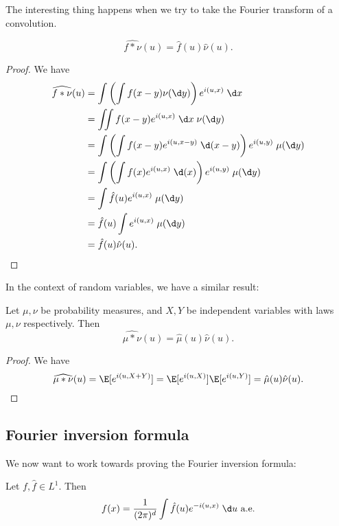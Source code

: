 \documentclass[a4paper]{article}
\begin{document}
The interesting thing happens when we try to take the Fourier transform of a convolution.
\begin{prop}
  \[
    \widehat{f * \nu}(u) = \hat{f}(u) \hat{\nu}(u).
  \]
\end{prop}

\begin{proof}
  We have
  \begin{align*}
    \widehat{f * \nu}(u) &= \int \left(\int f(x - y) \nu(\d y)\right) e^{i(u, x)}\;\d x\\
    &= \iint f(x - y) e^{i(u, x)} \;\d x\;\nu (\d y)\\
    &= \int \left(\int f(x - y) e^{i(u, x - y)} \;\d (x - y)\right) e^{i(u, y)}\;\mu(\d y)\\
    &= \int \left(\int f(x) e^{i(u, x)} \;\d (x)\right) e^{i(u, y)}\;\mu(\d y)\\
    &= \int \hat{f}(u) e^{i(u, x)}\;\mu(\d y)\\
    &= \hat{f}(u) \int e^{i(u, x)}\;\mu(\d y)\\
    &= \hat{f}(u) \hat{\nu}(u).
  \end{align*}
\end{proof}

In the context of random variables, we have a similar result:
\begin{prop}
  Let $\mu, \nu$ be probability measures, and $X, Y$ be independent variables with laws $\mu, \nu$ respectively. Then
  \[
    \widehat{\mu * \nu}(u) = \hat{\mu}(u) \hat{\nu}(u).
  \]
\end{prop}

\begin{proof}
  We have
  \[
    \widehat{\mu * \nu}(u) = \E[e^{i(u, X + Y)}] = \E[e^{i(u, X)}] \E[e^{i(u, Y)}] = \hat{\mu}(u) \hat{\nu}(u).
  \]
\end{proof}

\subsection{Fourier inversion formula}
We now want to work towards proving the Fourier inversion formula:
\begin{thm}
  Let $f,\hat{f} \in L^1$. Then
  \[
    f(x) = \frac{1}{(2\pi)^d} \int \hat{f}(u) e^{-i(u, x)} \;\d u\text{ a.e.}
  \]
\end{thm}
\end{document}
